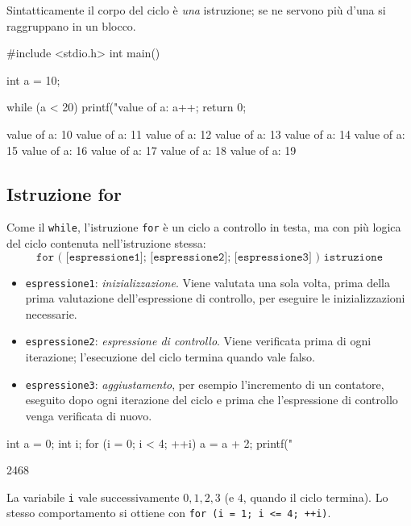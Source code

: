 \documentclass[11pt,a4paper]{article}
\begin{document}
Sintatticamente il corpo del ciclo è \emph{una} istruzione; se ne servono più d'una si raggruppano in un blocco.

\begin{esempio}
\begin{codice}
#include <stdio.h>
int main() {
    int a = 10;

    while (a < 20) {
        printf("value of a: %
        a++;
    }
    return 0;
}
\end{codice}
\begin{risultato}
value of a: 10
value of a: 11
value of a: 12
value of a: 13
value of a: 14
value of a: 15
value of a: 16
value of a: 17
value of a: 18
value of a: 19
\end{risultato}
\end{esempio}

\subsection{Istruzione for}

Come il \lstinline|while|, l'istruzione \lstinline|for| è un ciclo a controllo in testa, ma con più logica del ciclo contenuta nell'istruzione stessa:
\[
\texttt{for ( [espressione1]; [espressione2]; [espressione3] ) istruzione}
\]
\begin{itemize}
    \item \texttt{espressione1}: \emph{inizializzazione}. Viene valutata una sola volta, prima della prima valutazione dell'espressione di controllo, per eseguire le inizializzazioni necessarie.
    \item \texttt{espressione2}: \emph{espressione di controllo}. Viene verificata prima di ogni iterazione; l'esecuzione del ciclo termina quando vale falso.
    \item \texttt{espressione3}: \emph{aggiustamento}, per esempio l'incremento di un contatore, eseguito dopo ogni iterazione del ciclo e prima che l'espressione di controllo venga verificata di nuovo.
\end{itemize}

\begin{esempio}
\begin{codice}
int a = 0;
int i;
for (i = 0; i < 4; ++i) {
    a = a + 2;
    printf("%
}
\end{codice}
\begin{risultato}
2468
\end{risultato}
La variabile \lstinline|i| vale successivamente $0, 1, 2, 3$ (e $4$, quando il ciclo termina). Lo stesso comportamento si ottiene con \lstinline|for (i = 1; i <= 4; ++i)|.
\end{esempio}
\end{document}

